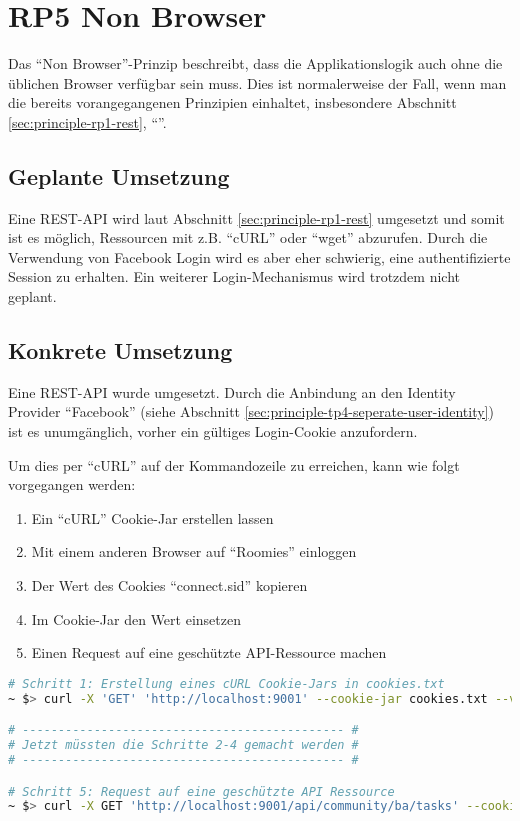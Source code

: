 \section{RP5 Non Browser}
\label{sec:principle-rp5-non-browser}

Das ``Non Browser''-Prinzip beschreibt, dass die Applikationslogik auch ohne die üblichen Browser verfügbar sein muss. Dies ist normalerweise der Fall, wenn man die bereits vorangegangenen Prinzipien einhaltet, insbesondere Abschnitt \ref{sec:principle-rp1-rest}, ``''.

\subsection*{Geplante Umsetzung}
Eine \gls{REST}-API wird laut Abschnitt \ref{sec:principle-rp1-rest} umgesetzt und somit ist es möglich, Ressourcen mit z.B. ``cURL'' \cite{curl} oder ``wget'' \cite{wget} abzurufen.
Durch die Verwendung von Facebook Login wird es aber eher schwierig, eine authentifizierte Session zu erhalten. Ein weiterer Login-Mechanismus wird trotzdem nicht geplant.

\subsection*{Konkrete Umsetzung}
Eine REST-API wurde umgesetzt. Durch die Anbindung an den Identity Provider ``Facebook'' (siehe Abschnitt \ref{sec:principle-tp4-seperate-user-identity}) ist es unumgänglich, vorher ein gültiges Login-Cookie anzufordern.

Um dies per ``cURL'' auf der Kommandozeile zu erreichen, kann wie folgt vorgegangen werden:
\begin{enumerate}
	\item Ein ``cURL'' Cookie-Jar erstellen lassen
	\item Mit einem anderen Browser auf ``Roomies'' einloggen
	\item Der Wert des Cookies ``connect.sid'' kopieren
	\item Im Cookie-Jar den Wert einsetzen
	\item Einen Request auf eine geschützte API-Ressource machen
\end{enumerate}

\begin{lstlisting}[language=Bash, caption=cURL Request auf Roomies, label=lst:curlRoomiesAPI]
# Schritt 1: Erstellung eines cURL Cookie-Jars in cookies.txt
~ $> curl -X 'GET' 'http://localhost:9001' --cookie-jar cookies.txt --verbose --location

# --------------------------------------------- #
# Jetzt müssten die Schritte 2-4 gemacht werden #
# --------------------------------------------- #

# Schritt 5: Request auf eine geschützte API Ressource
~ $> curl -X GET 'http://localhost:9001/api/community/ba/tasks' --cookie cookies.txt  --verbose --location
\end{lstlisting}

